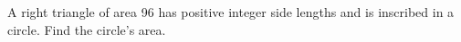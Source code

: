 A right triangle of area 96 has positive integer side lengths and is inscribed in a circle. Find the circle's area.
